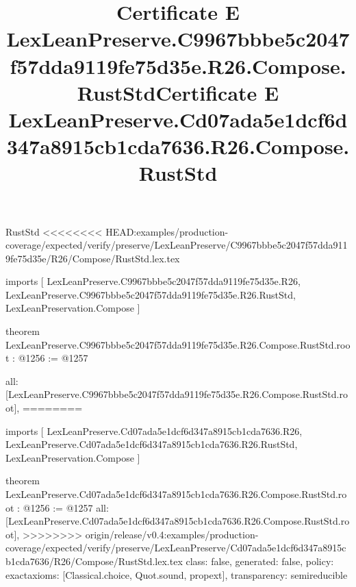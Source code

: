 \begin{lexlean}{RustStd}
<<<<<<<< HEAD:examples/production-coverage/expected/verify/preserve/LexLeanPreserve/C9967bbbe5c2047f57dda9119fe75d35e/R26/Compose/RustStd.lex.tex
\title{Certificate E LexLeanPreserve.C9967bbbe5c2047f57dda9119fe75d35e.R26.Compose.RustStd}
\begin{coremodule}
imports [
  LexLeanPreserve.C9967bbbe5c2047f57dda9119fe75d35e.R26,
  LexLeanPreserve.C9967bbbe5c2047f57dda9119fe75d35e.R26.RustStd,
  LexLeanPreservation.Compose
]

theorem LexLeanPreserve.C9967bbbe5c2047f57dda9119fe75d35e.R26.Compose.RustStd.root : @1256 := @1257 {
  all: [LexLeanPreserve.C9967bbbe5c2047f57dda9119fe75d35e.R26.Compose.RustStd.root],
========
\title{Certificate E LexLeanPreserve.Cd07ada5e1dcf6d347a8915cb1cda7636.R26.Compose.RustStd}
\begin{coremodule}
imports [
  LexLeanPreserve.Cd07ada5e1dcf6d347a8915cb1cda7636.R26,
  LexLeanPreserve.Cd07ada5e1dcf6d347a8915cb1cda7636.R26.RustStd,
  LexLeanPreservation.Compose
]

theorem LexLeanPreserve.Cd07ada5e1dcf6d347a8915cb1cda7636.R26.Compose.RustStd.root : @1256 := @1257 {
  all: [LexLeanPreserve.Cd07ada5e1dcf6d347a8915cb1cda7636.R26.Compose.RustStd.root],
>>>>>>>> origin/release/v0.4:examples/production-coverage/expected/verify/preserve/LexLeanPreserve/Cd07ada5e1dcf6d347a8915cb1cda7636/R26/Compose/RustStd.lex.tex
  class: false,
  generated: false,
  policy: exact{axioms: [Classical.choice, Quot.sound, propext]},
  transparency: semireducible
}


\end{coremodule}}
\end{coremodule}
\end{lexlean}
